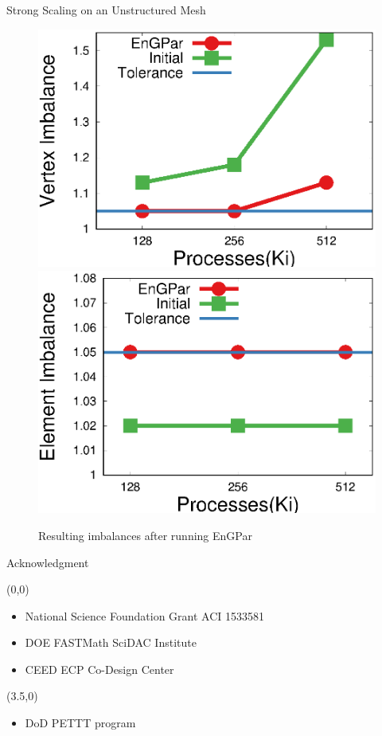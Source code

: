 \documentclass{beamer}
\begin{document}
\begin{textblock}{15.6}
\begin{textblock}{5.1}
\begin{block}{\centering Strong Scaling on an Unstructured Mesh}
      \begin{figure}
        \centering
        \includegraphics[width=.45\textwidth]{../plots/mira_fem_results/vimb_v_cores.eps}
        \includegraphics[width=.45\textwidth]{../plots/mira_fem_results/eimb_v_cores.eps}
        \caption{Resulting imbalances after running EnGPar}
      \end{figure}
    \end{block}

    \begin{block}{\centering Acknowledgment}
      \begin{textblock}{3.5}(0,0)
      \begin{itemize}
      \item National Science Foundation Grant ACI 1533581
      \item DOE FASTMath SciDAC Institute
      \item CEED ECP Co-Design Center
      \end{itemize}
      \end{textblock}
      \begin{textblock}{1.5}(3.5,0)
        \begin{itemize}
          \item DoD PETTT program
        \end{itemize}
      \end{textblock}
      \vspace{4.2cm}
    \end{block}
  \end{textblock}


\end{textblock}
\end{document}
